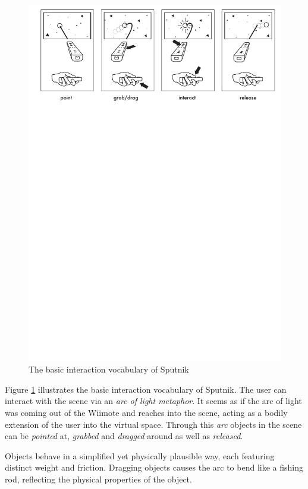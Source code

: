 \documentclass[10pt,a4paper]{scrartcl}
\begin{document}
\begin{figure}[hbtp]
\begin{center}
\includegraphics[width=0.95\columnwidth]{img/sputnik-overview}
\caption{The basic interaction vocabulary of Sputnik}
\label{fig:sputnik-overview}
\end{center}
\end{figure}

Figure \ref{fig:sputnik-overview} illustrates the basic interaction vocabulary of Sputnik. The user can interact with the scene via an \emph{arc of light metaphor}. It seems as if the arc of light was coming out of the Wiimote and reaches into the scene, acting as a bodily extension of the user into the virtual space. Through this \emph{arc} objects in the scene can be \emph{pointed} at, \emph{grabbed} and \emph{dragged} around as well as \emph{released}.

Objects behave in a simplified yet physically plausible way, each featuring distinct weight and friction. Dragging objects causes the arc to bend like a fishing rod, reflecting the physical properties of the object.
\end{document}
